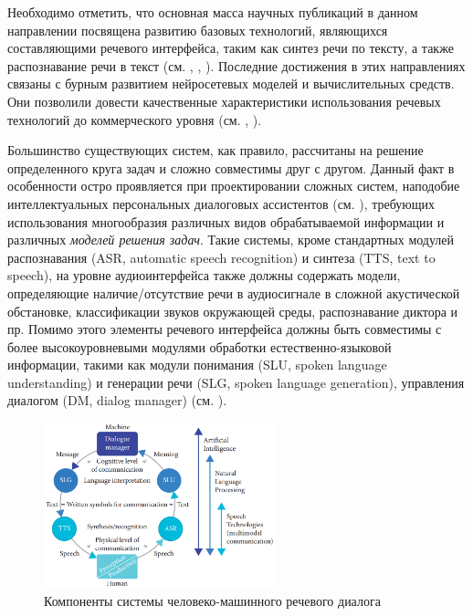 Необходимо отметить, что основная масса научных публикаций в данном направлении посвящена развитию базовых технологий, являющихся составляющими речевого интерфейса, таким как синтез речи по тексту, а также распознавание речи в текст (см. , , ). Последние достижения в этих направлениях связаны с бурным развитием нейросетевых моделей и вычислительных средств. Они позволили довести качественные характеристики использования речевых технологий до коммерческого уровня (см. , ).

Большинство существующих систем, как правило, рассчитаны на решение определенного круга задач и сложно совместимы друг с другом. Данный факт в особенности остро проявляется при проектировании сложных систем, наподобие интеллектуальных персональных диалоговых ассистентов (см. \textit{}), требующих использования многообразия различных видов обрабатываемой информации и различных \textit{моделей решения задач}. Такие системы, кроме стандартных модулей распознавания (ASR, automatic speech recognition) и синтеза (TTS, text to speech), на уровне аудиоинтерфейса также должны содержать модели, определяющие наличие/отсутствие речи в аудиосигнале в сложной акустической обстановке, классификации звуков окружающей среды, распознавание диктора и пр. Помимо этого элементы речевого интерфейса должны быть совместимы с более высокоуровневыми модулями обработки естественно-языковой информации, такими как модули понимания (SLU, spoken language understanding) и генерации речи (SLG, spoken language generation), управления диалогом (DM, dialog manager) (см. ). 

\begin{figure}[H]
    \caption{Компоненты системы человеко-машинного речевого диалога \cite{Delic2019speech}}
    \includegraphics[scale=0.6, width=0.6\textwidth]{author/part4/figures/ch43_fig01_speech-hmi-components.png}
    
    \label{fig:speech-hmi-components}
\end{figure}

